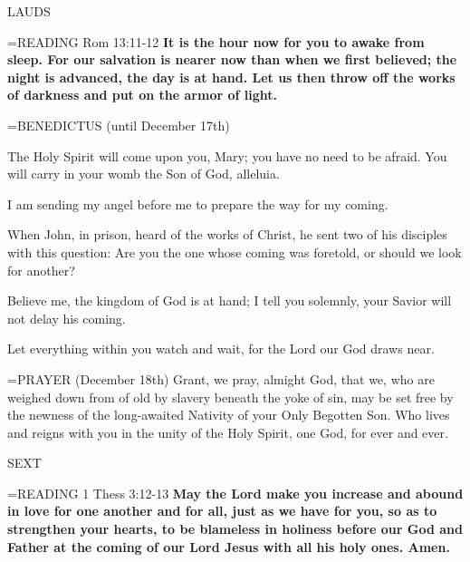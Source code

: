 \begin{flushleft}\normalsize LAUDS\\\end{flushleft}

\hangindent=\parindent \small{READING} Rom 13:11-12 \textbf{ It is the hour now for you to awake from sleep. For our salvation is nearer now than when we first believed; the night is advanced, the day is at hand. Let us then throw off the works of darkness and put on the armor of light.\\}

\hangindent=\parindent \small BENEDICTUS (until December 17th)
\begin{description}[labelindent=\parindent, noitemsep, leftmargin=*]
\item [Week 1:]  The Holy Spirit will come upon you, Mary; you have no need to be afraid. You will carry in your womb the Son of God, alleluia.
\item [Week 2:]  I am sending my angel before me to prepare the way for my coming.
\item [Week 3:]  When John, in prison, heard of the works of Christ, he sent two of his disciples with this question: Are you the one whose coming was foretold, or should we look for another?
\item [(December 17th):]  Believe me, the kingdom of God is at hand; I tell you solemnly, your Savior will not delay his coming.
\item [(December 18th):]  Let everything within you watch and wait, for the Lord our God draws near.
\end{description}

\hangindent=\parindent \small{PRAYER  (December 18th) Grant, we pray, almight God, that we, who are weighed down from of old by slavery beneath the yoke of sin, may be set free by the newness of the long-awaited Nativity of your Only Begotten Son. Who lives and reigns with you in the unity of the Holy Spirit, one God, for ever and ever.}

\begin{flushleft}\normalsize SEXT\\\end{flushleft}

\hangindent=\parindent \small{READING} 1 Thess 3:12-13 \textbf{May the Lord make you increase and abound in love for one another and for all, just as we have for you, so as to strengthen your hearts, to be blameless in holiness before our God and Father at the coming of our Lord Jesus with all his holy ones. Amen.}

